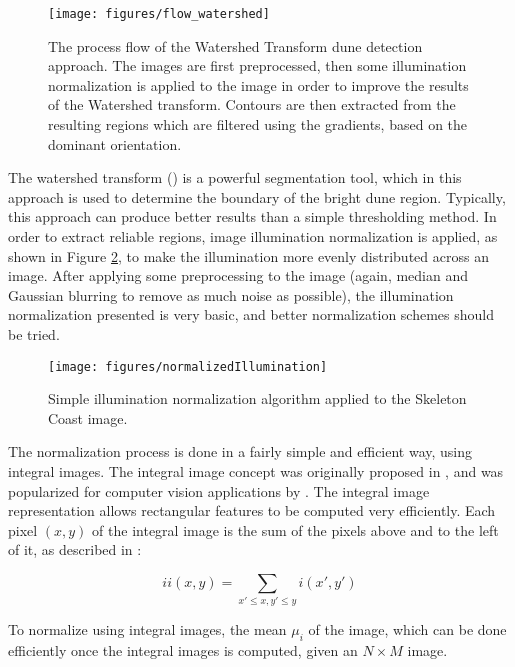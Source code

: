  \begin{figure}[H]
 	\centering
 	\texttt{[image: figures/flow\_watershed]}
 	\caption{The process flow of the Watershed Transform dune detection approach. The images are first preprocessed, then some illumination normalization is applied to the image in order to improve the results of the Watershed transform. Contours are then extracted from the resulting regions which are filtered using the gradients, based on the dominant orientation. }
 	\label{fig:flow_watershed}
 \end{figure}
 
  The watershed transform (\cite{2014_priority_flood,1979_workshop_image_processing,1994_watershed_continuous_function}) is a powerful segmentation tool, which in this approach is used to determine the boundary of the bright dune region. Typically, this approach can produce better results than a simple thresholding method. In order to extract reliable regions, image illumination normalization is applied, as shown in Figure \ref{fig:illumination_normalization}, to make the illumination more evenly distributed across an image. After applying some preprocessing to the image (again, median and Gaussian blurring to remove as much noise as possible), the illumination normalization presented is very basic, and better normalization schemes should be tried.

\begin{figure}
	\centering
	\texttt{[image: figures/normalizedIllumination]}
	\caption{Simple illumination normalization algorithm applied to the Skeleton Coast image.}
	\label{fig:illumination_normalization}
\end{figure}

The normalization process is done in a fairly simple and efficient way, using integral images. The integral image concept was originally proposed in \cite{Summed-area-tables-for-texture-mapping}, and was popularized for computer vision applications by \cite{Robust-real-time-Object-Detection}. The integral image representation allows rectangular features to be computed very efficiently. Each pixel $(x,y)$ of the integral image is the sum of the pixels above and to the left of it, as described in \cite{Robust-real-time-Object-Detection}:

\begin{equation}
ii\left(x,y\right)=\sum_{x'\leq x,y'\leq y}i\left(x',y'\right)
\end{equation}

To normalize using integral images, the mean $\mu_{i}$ of the image, which can be done efficiently once the integral images is computed, given an $N\times M$ image.

